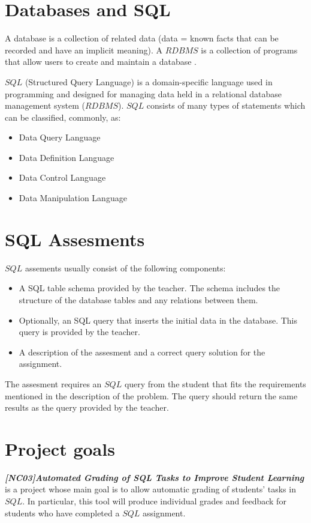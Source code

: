 \section{Databases and SQL}
A database is a collection of related data (data = known facts that can be
recorded and have an implicit meaning). A $RDBMS$ is a collection of programs
that allow users to create and maintain a database \cite{sql_course}.

$SQL$ (Structured Query Language) is a domain-specific language used in programming
and designed for managing data held in a relational database management system ($RDBMS$).
$SQL$ consists of many types of statements which can be classified, commonly, as: \cite{wiki:sql}
\begin{itemize}
    \item Data Query Language
    \item Data Definition Language
    \item Data Control Language
    \item Data Manipulation Language
\end{itemize}


\section{SQL Assesments}
$SQL$ assements usually consist of the following components:

\begin{itemize}
    \item A SQL table schema provided by the teacher. The schema includes
    the structure of the database tables and any relations between them.
    \item Optionally, an SQL query that inserts the initial data in the database.
    This query is provided by the teacher.
    \item A description of the assesment and a correct query solution for the
    assignment.
\end{itemize}

The assesment requires an $SQL$ query from the student that fits the requirements
mentioned in the description of the problem. The query should return the same
results as the query provided by the teacher.

\section{Project goals}
\textbf{\textit{[NC03]Automated Grading of SQL Tasks to Improve Student Learning}}
is a project whose main goal is to allow automatic grading of students' tasks
in $SQL$. In particular, this tool will produce individual grades and feedback
for students who have completed a $SQL$ assignment.

